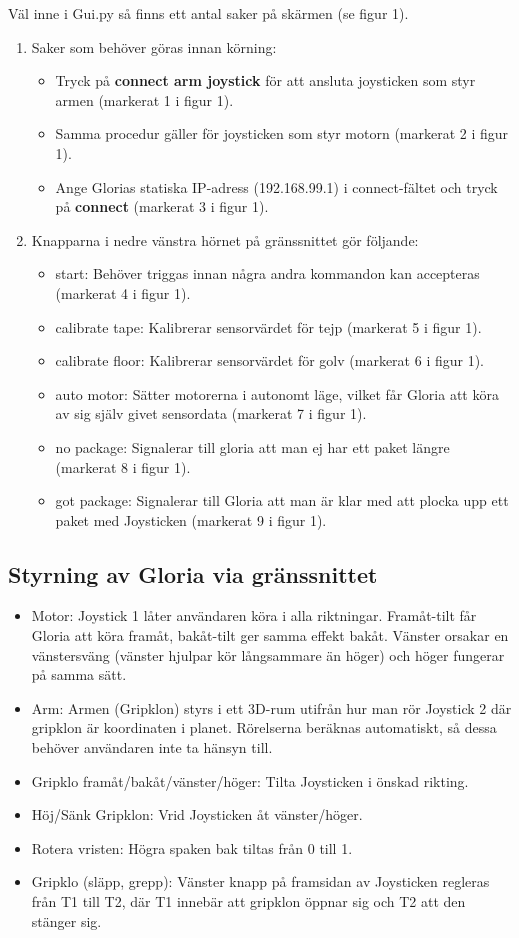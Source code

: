 Väl inne i Gui.py så finns ett antal saker på skärmen (se figur 1).
\begin{enumerate}
	\item Saker som behöver göras innan körning:
	\begin{itemize}
		\item Tryck på \textbf{connect arm joystick} för att ansluta joysticken som styr armen (markerat 1 i figur 1).
		\item Samma procedur gäller för joysticken som styr motorn (markerat 2 i figur 1).
		\item Ange Glorias statiska IP-adress (192.168.99.1) i connect-fältet och tryck på \textbf{connect} (markerat 3 i figur 1).
	\end{itemize}
	\item Knapparna i nedre vänstra hörnet på gränssnittet gör följande:
	\begin{itemize}
		\item start: Behöver triggas innan några andra kommandon kan accepteras (markerat 4 i figur 1).
		\item calibrate tape: Kalibrerar sensorvärdet för tejp (markerat 5 i figur 1).
		\item calibrate floor: Kalibrerar sensorvärdet för golv (markerat 6 i figur 1).
		\item auto motor: Sätter motorerna i autonomt läge, vilket får Gloria att köra av sig själv givet sensordata (markerat 7 i figur 1).		
		\item no package: Signalerar till gloria att man ej har ett paket längre (markerat 8 i figur 1).
		\item got package: Signalerar till Gloria att man är klar med att plocka upp ett paket med Joysticken (markerat 9 i figur 1).
	\end{itemize}
\end{enumerate}
\subsection{Styrning av Gloria via gränssnittet}
	\begin{itemize}	
		\item Motor: Joystick 1 låter användaren köra i alla riktningar. Framåt-tilt får Gloria att köra framåt, bakåt-tilt ger samma effekt bakåt. Vänster orsakar en vänstersväng (vänster hjulpar kör långsammare än höger) och höger fungerar på samma sätt.
		\item Arm: Armen (Gripklon) styrs i ett 3D-rum utifrån hur man rör Joystick 2 där gripklon är koordinaten i planet. Rörelserna beräknas automatiskt, så dessa behöver användaren inte ta hänsyn till. 
		\item Gripklo framåt/bakåt/vänster/höger: Tilta Joysticken i önskad rikting.
		\item Höj/Sänk Gripklon: Vrid Joysticken åt vänster/höger.
		\item Rotera vristen: Högra spaken bak tiltas från 0 till 1.
		\item Gripklo (släpp, grepp): Vänster knapp på framsidan av Joysticken regleras från T1 till T2, där T1 innebär att gripklon öppnar sig och T2 att den stänger sig.
	\end{itemize}
